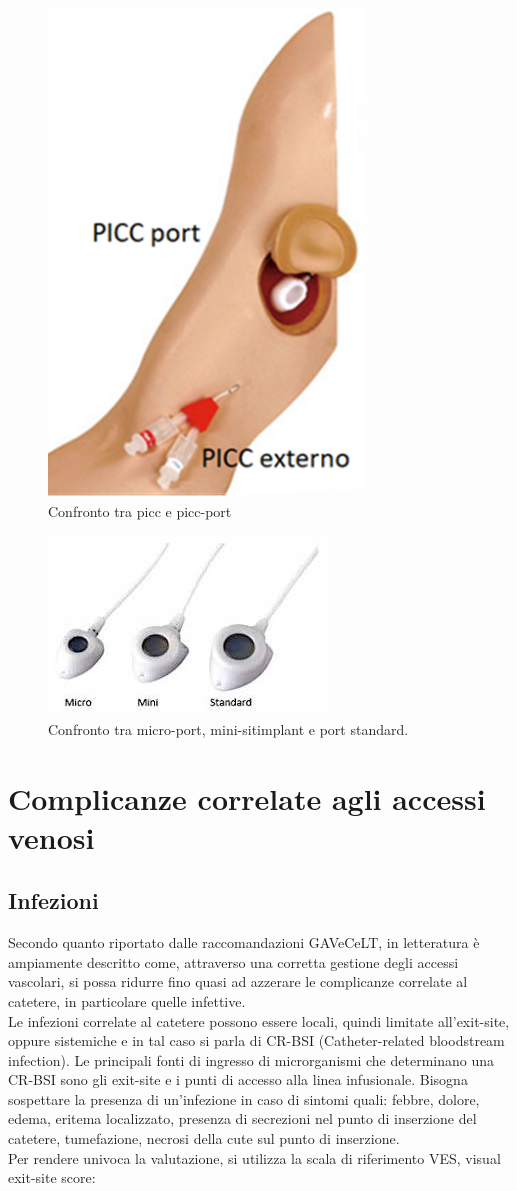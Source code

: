 \begin{figure}[H]
    \begin{center}
    \includegraphics[width=0.2\columnwidth]{img/PartesPICC.png}
    \vspace{-3mm}
    \end{center}
    \caption{Confronto tra picc e picc-port
    \cite{img49}}
    \label{fig:FIGURE_4.13}
\end{figure}

\begin{figure}[H]
    \begin{center}
    \includegraphics[width=0.3\columnwidth]{img/portconfronto.jpeg}
    \vspace{-3mm}
    \end{center}
    \caption{Confronto tra micro-port, mini-sitimplant e port standard.
    \cite{GAVECELTPICCPORT}}
    \label{fig:FIGURE_4.14}
\end{figure}

\section{Complicanze correlate agli accessi venosi}

\subsection{Infezioni}

Secondo quanto riportato dalle raccomandazioni GAVeCeLT, in letteratura è ampiamente descritto come, attraverso una 
corretta gestione degli accessi vascolari, si possa ridurre fino quasi ad azzerare le complicanze correlate al 
catetere, in particolare quelle infettive\cite{GAVECELTracc2021}.\\
Le infezioni correlate al catetere possono essere locali, quindi limitate all’exit-site, oppure sistemiche e in tal 
caso si parla di CR-BSI (Catheter-related bloodstream infection). Le principali fonti di ingresso di microrganismi 
che determinano una CR-BSI sono gli exit-site e i punti di accesso alla linea infusionale. 
Bisogna sospettare la presenza di un’infezione in caso di sintomi quali: febbre, dolore, edema, eritema localizzato, 
presenza di secrezioni nel punto di inserzione del catetere, tumefazione, necrosi della cute sul punto di inserzione\cite{AIOMCVC}.\\
Per rendere univoca la valutazione, si utilizza la scala di riferimento VES, visual exit-site score:

